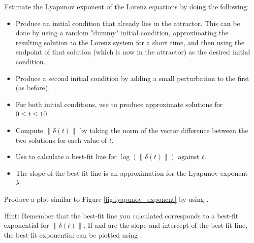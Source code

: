 \begin{problem}
Estimate the Lyapunov exponent of the Lorenz equations by doing the following:
\begin{itemize}
	\item Produce an initial condition that already lies in the attractor. This can be done by using a random "dummy" initial condition, approximating the resulting solution to the Lorenz system for a short time, and then using the endpoint of that solution (which is now in the attractor) as the desired initial condition.
	\item Produce a second initial condition by adding a small perturbation to the first (as before).
	\item For both initial conditions, use  to produce approximate solutions for $0 \leq t \leq 10$
	\item Compute $\|\delta(t)\|$ by taking the norm of the vector difference between the two solutions for each value of $t$.
	\item Use  to calculate a best-fit line for $\log(\|\delta(t)\|)$ against $t$.
	\item The slope of the best-fit line is an approximation for the Lyapunov exponent $\lambda$
	
\end{itemize}
Produce a plot similar to Figure \ref{fig:lyapunov_exponent} by using .

Hint: Remember that the best-fit line you calculated corresponds to a best-fit exponential for $\|\delta(t)\|$. If  and  are the slope and intercept of the best-fit line, the best-fit exponential can be plotted using .
	

\end{problem}